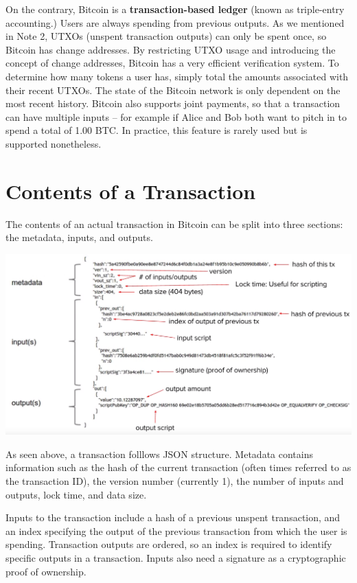 \documentclass[full.tex]{subfiles}
\begin{document}
    On the contrary, Bitcoin is a \textbf{transaction-based ledger} (known as triple-entry accounting.) Users are always spending from previous outputs. As we mentioned in Note 2, UTXOs (unspent transaction outputs) can only be spent once, so Bitcoin has change addresses. By restricting UTXO usage and introducing the concept of change addresses, Bitcoin has a very efficient verification system. To determine how many tokens a user has, simply total the amounts associated with their recent UTXOs. The state of the Bitcoin network is only dependent on the most recent history. Bitcoin also supports joint payments, so that a transaction can have multiple inputs -- for example if Alice and Bob both want to pitch in to spend a total of 1.00 BTC. In practice, this feature is rarely used but is supported nonetheless.
    
    \section*{Contents of a Transaction}
    
    The contents of an actual transaction in Bitcoin can be split into three sections: the metadata, inputs, and outputs. 
    
   \includegraphics[scale=0.3]{transaction_contents}
   
   As seen above, a transaction folllows JSON structure. Metadata contains information such as the hash of the current transaction (often times referred to as the transaction ID), the version number (currently 1), the number of inputs and outputs, lock time, and data size.
   
   Inputs to the transaction include a hash of a previous unspent transaction, and an index specifying the output of the previous transaction from which the user is spending. Transaction outputs are ordered, so an index is required to identify specific outputs in a transaction. Inputs also need a signature as a cryptographic proof of ownership. 
   
\end{document}
